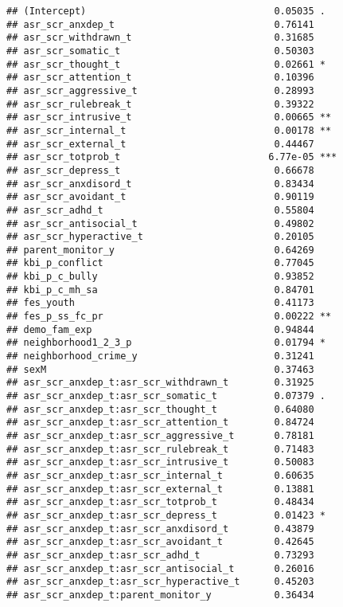 \documentclass[
]{article}
\begin{document}
\begin{verbatim}
## (Intercept)                                 0.05035 .  
## asr_scr_anxdep_t                            0.76141    
## asr_scr_withdrawn_t                         0.31685    
## asr_scr_somatic_t                           0.50303    
## asr_scr_thought_t                           0.02661 *  
## asr_scr_attention_t                         0.10396    
## asr_scr_aggressive_t                        0.28993    
## asr_scr_rulebreak_t                         0.39322    
## asr_scr_intrusive_t                         0.00665 ** 
## asr_scr_internal_t                          0.00178 ** 
## asr_scr_external_t                          0.44467    
## asr_scr_totprob_t                          6.77e-05 ***
## asr_scr_depress_t                           0.66678    
## asr_scr_anxdisord_t                         0.83434    
## asr_scr_avoidant_t                          0.90119    
## asr_scr_adhd_t                              0.55804    
## asr_scr_antisocial_t                        0.49802    
## asr_scr_hyperactive_t                       0.20105    
## parent_monitor_y                            0.64269    
## kbi_p_conflict                              0.77045    
## kbi_p_c_bully                               0.93852    
## kbi_p_c_mh_sa                               0.84701    
## fes_youth                                   0.41173    
## fes_p_ss_fc_pr                              0.00222 ** 
## demo_fam_exp                                0.94844    
## neighborhood1_2_3_p                         0.01794 *  
## neighborhood_crime_y                        0.31241    
## sexM                                        0.37463    
## asr_scr_anxdep_t:asr_scr_withdrawn_t        0.31925    
## asr_scr_anxdep_t:asr_scr_somatic_t          0.07379 .  
## asr_scr_anxdep_t:asr_scr_thought_t          0.64080    
## asr_scr_anxdep_t:asr_scr_attention_t        0.84724    
## asr_scr_anxdep_t:asr_scr_aggressive_t       0.78181    
## asr_scr_anxdep_t:asr_scr_rulebreak_t        0.71483    
## asr_scr_anxdep_t:asr_scr_intrusive_t        0.50083    
## asr_scr_anxdep_t:asr_scr_internal_t         0.60635    
## asr_scr_anxdep_t:asr_scr_external_t         0.13881    
## asr_scr_anxdep_t:asr_scr_totprob_t          0.48434    
## asr_scr_anxdep_t:asr_scr_depress_t          0.01423 *  
## asr_scr_anxdep_t:asr_scr_anxdisord_t        0.43879    
## asr_scr_anxdep_t:asr_scr_avoidant_t         0.42645    
## asr_scr_anxdep_t:asr_scr_adhd_t             0.73293    
## asr_scr_anxdep_t:asr_scr_antisocial_t       0.26016    
## asr_scr_anxdep_t:asr_scr_hyperactive_t      0.45203    
## asr_scr_anxdep_t:parent_monitor_y           0.36434    

\end{verbatim}
\end{document}
